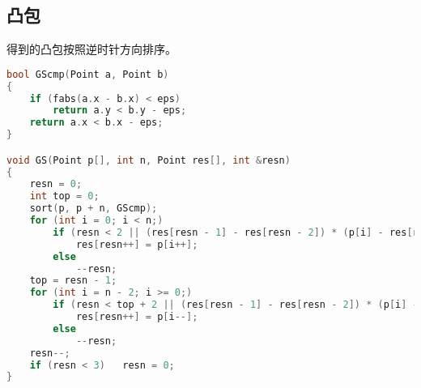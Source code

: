 \subsection{凸包}
	得到的凸包按照逆时针方向排序。
	\begin{lstlisting}[language=c++]
bool GScmp(Point a, Point b)
{
	if (fabs(a.x - b.x) < eps)
		return a.y < b.y - eps;
	return a.x < b.x - eps;
}

void GS(Point p[], int n, Point res[], int &resn)
{
	resn = 0;
	int top = 0;
	sort(p, p + n, GScmp);
	for (int i = 0; i < n;)
		if (resn < 2 || (res[resn - 1] - res[resn - 2]) * (p[i] - res[resn - 1]) > eps)
			res[resn++] = p[i++];
		else
			--resn;
	top = resn - 1;
	for (int i = n - 2; i >= 0;)
		if (resn < top + 2 || (res[resn - 1] - res[resn - 2]) * (p[i] - res[resn - 1]) > eps)
			res[resn++] = p[i--];
		else
			--resn;
	resn--;
	if (resn < 3)   resn = 0;
}
	\end{lstlisting}
	